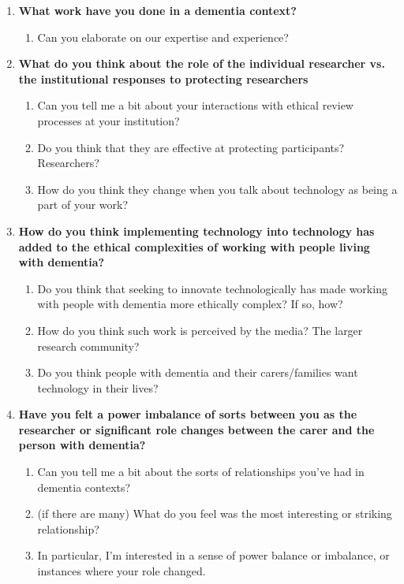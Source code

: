 \begin{enumerate}

   \item \textbf{What work have you done in a dementia context?}
\begin{enumerate}
        \item Can you elaborate on our expertise and experience?
\end{enumerate}

    \item \textbf{What do you think about the role of the individual researcher vs. the institutional responses to protecting researchers}
    \begin{enumerate}
        \item Can you tell me a bit about your interactions with ethical review processes at your institution?
        \item Do you think that they are effective at protecting participants? Researchers?
        \item How do you think they change when you talk about technology as being a part of your work?
    \end{enumerate}

    \item \textbf{How do you think implementing technology into technology has added to the ethical complexities of working with people living with dementia?}
    \begin{enumerate}
        \item Do you think that seeking to innovate technologically has made working with people with dementia more ethically complex? If so, how?
        \item How do you think such work is perceived by the media? The larger research community?
        \item Do you think people with dementia and their carers/families want technology in their lives?
    \end{enumerate}

    \item \textbf{Have you felt a power imbalance of sorts between you as the researcher or significant role changes between the carer and the person with dementia?}
    \begin{enumerate}
        \item Can you tell me a bit about the sorts of relationships you’ve had in dementia contexts?
        \item (if there are many) What do you feel was the most interesting or striking relationship?
        \item In particular, I’m interested in a sense of power balance or imbalance, or instances where your role changed.
    \end{enumerate}


\end{enumerate}

